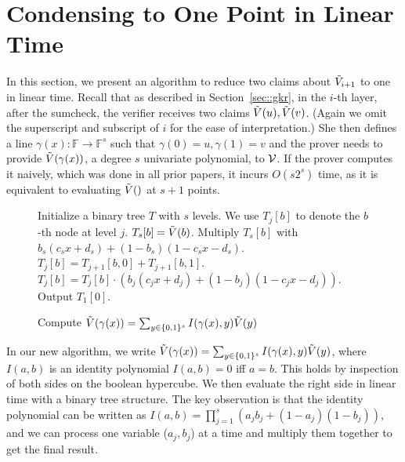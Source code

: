 \newpage

\appendix

\section{Condensing to One Point in Linear Time}\label{app:onepoint}


In this section, we present an algorithm to reduce two claims about $\tilde{V}_{i+1}$ to one in linear time. Recall that as described in Section~\ref{sec::gkr}, in the $i$-th layer, after the sumcheck, the verifier receives two claims $\tilde{V}(u), \tilde{V}(v)$. (Again we omit the superscript and subscript of $i$ for the ease of interpretation.) She then defines a line $\gamma(x): \mathbb{F}\rightarrow\mathbb{F}^{s}$ such that $\gamma(0) = u, \gamma(1)=v$ and the prover needs to provide $\tilde{V}(\gamma(x))$, a degree $s$ univariate polynomial, to $\mathcal{V}$. If the prover computes it naively, which was done in all prior papers, it incurs $O(s2^{s})$ time, as it is equivalent to evaluating $\tilde{V}()$ at $s+1$ points. 

\begin{figure}[t!]
	\begin{algorithm}[H]
		\label{alg::comb}
		\caption{Compute $\tilde{V}(\gamma(x)) = \sum_{y\in\{0,1\}^s}I(\gamma(x), y)\tilde{V}(y)$}
		\begin{algorithmic}[1]
			\State Initialize a binary tree $T$ with $s$ levels. We use $T_j[b]$ to denote the $b$-th node at level $j$.
				\State $T_s[b] = \tilde{V}(b)$.
				\State Multiply $T_s[b]$ with $b_s(c_s x+ d_s)+(1-b_s)(1-c_s x- d_s)$.
			\EndFor
					\State $T_j[b] = T_{j+1}[b,0]+T_{j+1}[b,1]$.
					\State $T_j[b] = T_j[b] \cdot (b_j(c_j x+ d_j)+(1-b_j)(1-c_j x- d_j))$. 
				\EndFor
			\EndFor
			\State Output $T_1[0]$.
		\end{algorithmic}
	\end{algorithm}
\end{figure}


In our new algorithm, we write $\tilde{V}(\gamma(x)) = \sum_{y\in\{0,1\}^s}I(\gamma(x), y)\tilde{V}(y)$, where $I(a,b)$ is an identity polynomial $I(a,b)=0$ iff $a=b$. This holds by inspection of both sides on the boolean hypercube. We then evaluate the right side in linear time with a binary tree structure. The key observation is that the identity polynomial can be written as $I(a,b) = \prod_{j=1}^s (a_jb_j+(1-a_j)(1-b_j))$, and we can process one variable ($a_j,b_j$) at a time and multiply them together to get the final result. 


